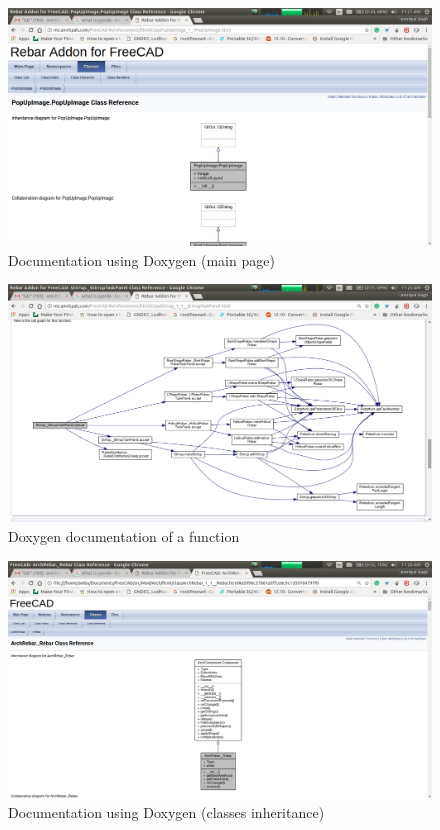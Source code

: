 \begin{figure}[H]
\centering \includegraphics[scale=.35]{images/doxy1.png}
\caption{Documentation using Doxygen (main page)}
\end{figure}


\begin{figure}[H]
\centering \includegraphics[scale=.35]{images/doxy2.png}
\caption{Doxygen documentation of a function}
\end{figure}
\begin{figure}[H]
\centering \includegraphics[scale=.35]{images/doxy3.png}
\caption{Documentation using Doxygen (classes inheritance)}
\end{figure}


